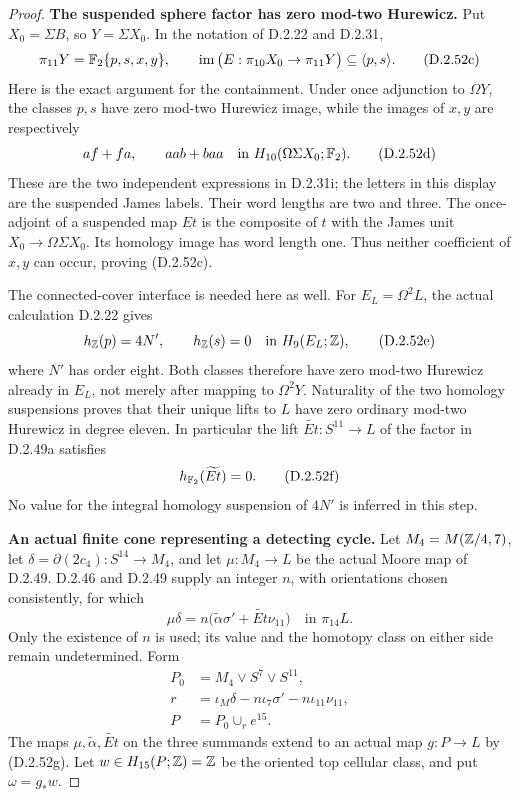 \begin{proof}
\textbf{The suspended sphere factor has zero mod-two Hurewicz.}
Put $X_0=\Sigma B$, so $Y=\Sigma X_0$. In the notation
of D.2.22 and D.2.31,
\[
 \pi_{11}Y=\mathbb F_2\{p,s,x,y\},\qquad
 \operatorname{im}\big(E:\pi_{10}X_0\to\pi_{11}Y\big)
                                  \subseteq\langle p,s\rangle.
 \tag{D.2.52c}
\]
Here is the exact argument for the containment. Under once
adjunction to $\Omega Y$, the classes $p,s$ have zero
mod-two Hurewicz image, while the images of $x,y$ are
respectively
\[
              af+fa,\qquad aab+baa
       \quad\text{in }H_{10}(\Omega\Sigma X_0;\mathbb F_2).
       \tag{D.2.52d}
\]
These are the two independent expressions in D.2.31i;
the letters in this display are the suspended James labels.
Their word lengths are two and three. The once-adjoint of
a suspended map $Et$ is the composite of $t$ with the James
unit $X_0\to\Omega\Sigma X_0$. Its homology image has
word length one. Thus neither coefficient of $x,y$ can
occur, proving \textup{(D.2.52c)}.

The connected-cover interface is needed here as well.
For $E_L=\Omega^2L$, the actual calculation D.2.22 gives
\[
                  h_{\mathbb Z}(p)=4N',\qquad h_{\mathbb Z}(s)=0
                          \quad\text{in }H_9(E_L;\mathbb Z),
                  \tag{D.2.52e}
\]
where $N'$ has order eight. Both classes therefore have
zero mod-two Hurewicz already in $E_L$, not merely after
mapping to $\Omega^2Y$. Naturality of the two homology
suspensions proves that their unique lifts to $L$ have
zero ordinary mod-two Hurewicz in degree eleven.
In particular the lift
$\widetilde{Et}:S^{11}\to L$ of the factor in D.2.49a
satisfies
\[
                        h_{\mathbb F_2}(\widetilde{Et})=0.
                        \tag{D.2.52f}
\]
No value for the integral homology suspension of $4N'$
is inferred in this step.

\textbf{An actual finite cone representing a detecting cycle.}
Let $M_4=M(\mathbb Z/4,7)$, let
$\delta=\partial(2c_4):S^{14}\to M_4$, and let
$\mu:M_4\to L$ be the actual Moore map of D.2.49.
D.2.46 and D.2.49 supply an integer $n$, with orientations
chosen consistently, for which
\[
 \mu\delta=n\bigl(\widetilde\alpha\sigma'
                        +\widetilde{Et}\nu_{11}\bigr)
                               \quad\text{in }\pi_{14}L.
 \tag{D.2.52g}
\]
Only the existence of $n$ is used; its value and the
homotopy class on either side remain undetermined.
Form
\[
\begin{split}
 P_0&=M_4\vee S^7\vee S^{11},\\
 r&=\iota_M\delta-n\iota_7\sigma'-n\iota_{11}\nu_{11},\\
 P&=P_0\cup_r e^{15}.
\end{split}
 \tag{D.2.52h}
\]
The maps $\mu,\widetilde\alpha,\widetilde{Et}$ on the
three summands extend to an actual map $g:P\to L$ by
\textup{(D.2.52g)}. Let $w\in H_{15}(P;\mathbb Z)=\mathbb Z$
be the oriented top cellular class, and put $\omega=g_*w$.


\end{proof}
